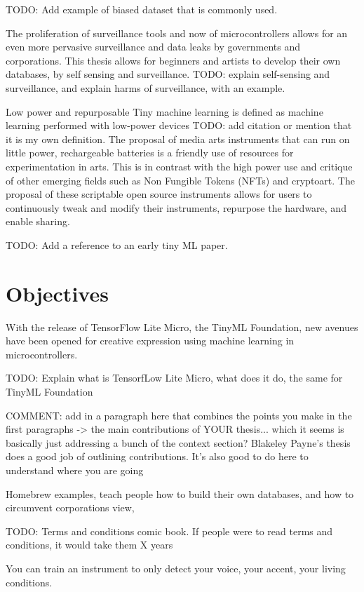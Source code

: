 TODO: Add example of biased dataset that is commonly used.

The proliferation of surveillance tools and now of microcontrollers allows for an even more pervasive surveillance and data leaks by governments and corporations. This thesis allows for beginners and artists to develop their own databases, by self sensing and surveillance. TODO: explain self-sensing and surveillance, and explain harms of surveillance, with an example.

Low power and repurposable
Tiny machine learning is defined as machine learning performed with low-power devices TODO: add citation or mention that it is my own definition. The proposal of media arts instruments that can run on little power, rechargeable batteries is a friendly use of resources for experimentation in arts. This is in contrast with the high power use and critique of other emerging fields such as Non Fungible Tokens (NFTs) and cryptoart. The proposal of these scriptable open source instruments allows for users to continuously tweak and modify their instruments, repurpose the hardware, and enable sharing.

TODO: Add a reference to an early tiny ML paper.

\section{Objectives}

With the release of TensorFlow Lite Micro, the TinyML Foundation, new avenues have been opened for creative expression using machine learning in microcontrollers.

TODO: Explain what is TensorfLow Lite Micro, what does it do, the same for TinyML Foundation

COMMENT: add in a paragraph here that combines the points you make in the first paragraphs -> the main contributions of YOUR thesis... which it seems is basically just addressing a bunch of the context section? Blakeley Payne's thesis does a good job of outlining contributions. It's also good to do here to understand where you are going

Homebrew examples, teach people how to build their own databases, and how to circumvent corporations view,

TODO: Terms and conditions comic book. If people were to read terms and conditions, it would take them X years

You can train an instrument to only detect your voice, your accent, your living conditions.

